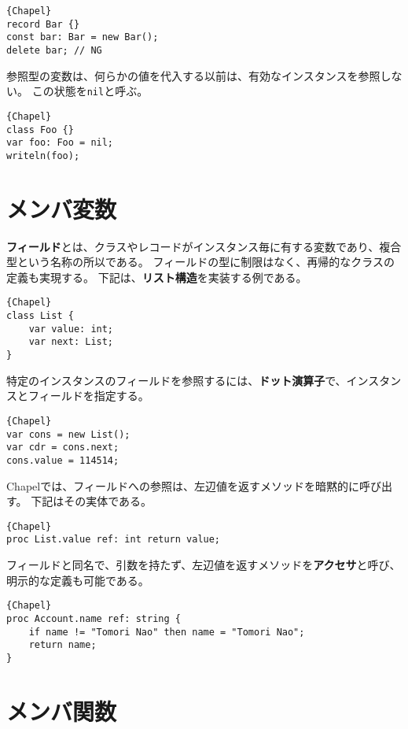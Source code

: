 \documentclass[10pt,a4paper]{book}
\begin{document}
\begin{Verbatim}{Chapel}
record Bar {}
const bar: Bar = new Bar();
delete bar; // NG
\end{Verbatim}

参照型の変数は、何らかの値を代入する以前は、有効なインスタンスを参照しない。
この状態を\verb#nil#と呼ぶ。

\begin{Verbatim}{Chapel}
class Foo {}
var foo: Foo = nil;
writeln(foo);
\end{Verbatim}

\section{メンバ変数}

\textbf{フィールド}とは、クラスやレコードがインスタンス毎に有する変数であり、複合型という名称の所以である。
フィールドの型に制限はなく、再帰的なクラスの定義も実現する。
下記は、\textbf{リスト構造}を実装する例である。

\begin{Verbatim}{Chapel}
class List {
	var value: int;
	var next: List;
}
\end{Verbatim}

特定のインスタンスのフィールドを参照するには、\textbf{ドット演算子}で、インスタンスとフィールドを指定する。

\begin{Verbatim}{Chapel}
var cons = new List();
var cdr = cons.next;
cons.value = 114514;
\end{Verbatim}

Chapelでは、フィールドへの参照は、左辺値を返すメソッドを暗黙的に呼び出す。
下記はその実体である。

\begin{Verbatim}{Chapel}
proc List.value ref: int return value;
\end{Verbatim}

フィールドと同名で、引数を持たず、左辺値を返すメソッドを\textbf{アクセサ}と呼び、明示的な定義も可能である。

\begin{Verbatim}{Chapel}
proc Account.name ref: string {
	if name != "Tomori Nao" then name = "Tomori Nao";
	return name;
}
\end{Verbatim}

\section{メンバ関数}
\end{document}
